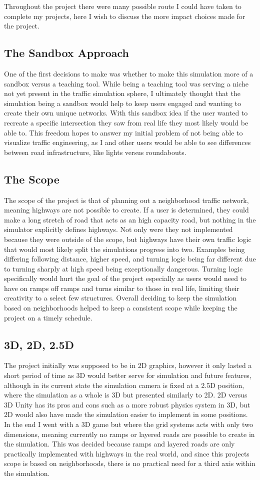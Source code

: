 \documentclass[10pt,twocolumn]{article}
\begin{document}
Throughout the project there were many possible route I could have taken to complete my projects, here I wish to discuss the more impact choices made for the project.
\subsection{The Sandbox Approach}
One of the first decisions to make was whether to make this simulation more of a sandbox versus a teaching tool. While being a teaching tool was serving a niche not yet present in the traffic simulation sphere, I ultimately thought that the simulation being a sandbox would help to keep users engaged and wanting to create their own unique networks. With this sandbox idea if the user wanted to recreate a specific intersection they saw from real life they most likely would be able to. This freedom hopes to answer my initial problem of not being able to visualize traffic engineering, as I and other users would be able to see differences between road infrastructure, like lights versus roundabouts.
\subsection{The Scope}
The scope of the project is that of planning out a neighborhood traffic network, meaning highways are not possible to create. If a user is determined, they could make a long stretch of road that acts as an high capacity road, but nothing in the simulator explicitly defines highways. Not only were they not implemented because they were outside of the scope, but highways have their own traffic logic that would most likely split the simulations progress into two. Examples being differing following distance, higher speed, and turning logic being far different due to turning sharply at high speed being exceptionally dangerous\cite{GeometricDesign}. Turning logic specifically would hurt the goal of the project especially as users would need to have on ramps off ramps and turns similar to those in real life, limiting their creativity to a select few structures. Overall deciding to keep the simulation based on neighborhoods helped to keep a consistent scope while keeping the project on a timely schedule.
\subsection{3D, 2D, 2.5D}
The project initially was supposed to be in 2D graphics, however it only lasted a short period of time as 3D would better serve for simulation and future features, although in its current state the simulation camera is fixed at a 2.5D position, where the simulation as a whole is 3D but presented similarly to 2D. 2D versus 3D Unity has its pros and cons such as a more robust physics system in 3D, but 2D would also have made the simulation easier to implement in some positions. In the end I went with a 3D game but where the grid systems acts with only two dimensions, meaning currently no ramps or layered roads are possible to create in the simulation. This was decided because ramps and layered roads are only practically implemented with highways in the real world, and since this projects scope is based on neighborhoods, there is no practical need for a third axis within the simulation. 
\end{document}
